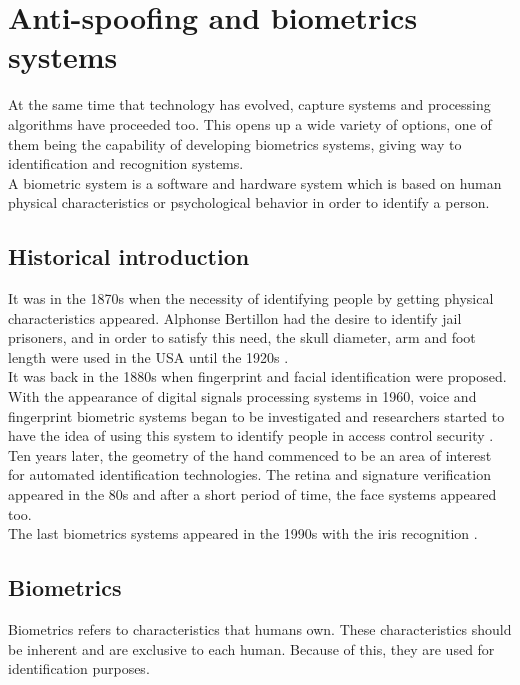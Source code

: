\section{Anti-spoofing and biometrics systems}
At the same time that technology has evolved, capture systems and processing algorithms have proceeded too. This opens up a wide variety of options,  one of them being the capability of developing biometrics systems, giving way to identification and recognition systems.\\
 
A biometric system is a software and hardware system which is based on human physical characteristics or psychological behavior in order to identify a person.

\subsection{Historical introduction}
It was in the 1870s when the necessity of identifying people by getting physical characteristics appeared. Alphonse Bertillon had the desire to identify jail prisoners, and in order to satisfy this need, the skull diameter, arm and foot length were used in the USA until the 1920s \cite{Intro_biometrics}.\\

It was back in the 1880s when fingerprint and facial identification were proposed. With the appearance of digital signals processing systems in 1960, voice and fingerprint biometric systems began to be investigated and researchers started to have the idea of using this system to identify people in access control security \cite{Intro_biometrics}.\\

Ten years later, the geometry of the hand commenced to be an area of interest for automated identification technologies. The retina and signature verification appeared in the 80s and after a short period of time, the face systems appeared too\cite{Intro_biometrics}.\\

The last biometrics systems appeared in the 1990s with the iris recognition \cite{Intro_biometrics}.

\subsection{Biometrics}
Biometrics refers to characteristics that humans own. These characteristics should be inherent and are exclusive to each human. Because of this, they are used for identification purposes.\\

